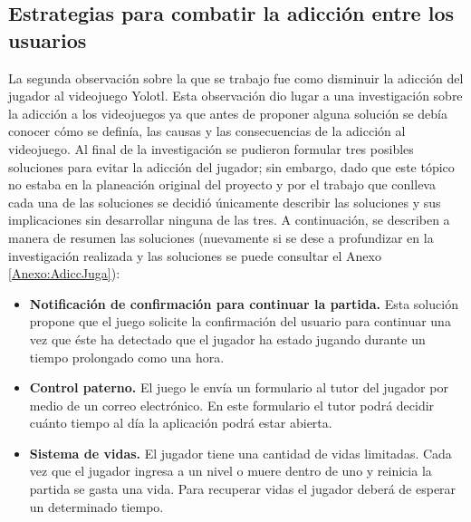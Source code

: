 \subsection{Estrategias para combatir la adicción entre los usuarios}
La segunda observación sobre la que se trabajo fue como disminuir la adicción
del jugador al videojuego Yolotl. Esta observación dio lugar a una investigación
sobre la adicción a los videojuegos ya que antes de proponer alguna solución se
debía conocer cómo se definía, las causas y las consecuencias de la adicción al
videojuego. Al final de la investigación se pudieron formular tres posibles
soluciones para evitar la adicción del jugador; sin embargo, dado que este tópico
no estaba en la planeación original del proyecto y por el trabajo que
conlleva cada una de las soluciones se decidió únicamente describir las
soluciones y sus implicaciones sin desarrollar ninguna de las tres. A continuación,
se describen a manera de resumen las soluciones (nuevamente si se dese a
profundizar en la investigación realizada y las soluciones se puede consultar
el Anexo \ref{Anexo:AdiccJuga}):
    \begin{itemize}
        \item \textbf{Notificación de confirmación para continuar la partida.} Esta
        solución propone que el juego solicite la confirmación del usuario para
        continuar una vez que éste ha detectado que el jugador ha estado jugando
        durante un tiempo prolongado como una hora.
        \item \textbf{Control paterno.} El juego le envía un formulario al tutor del
        jugador por medio de un correo electrónico. En este formulario el tutor podrá
        decidir cuánto tiempo al día la aplicación podrá estar abierta.
        \item \textbf{Sistema de vidas.} El jugador tiene una cantidad de vidas
        limitadas. Cada vez que el jugador ingresa a un nivel o muere dentro de
        uno y reinicia la partida se gasta una vida. Para recuperar vidas el
        jugador deberá de esperar un determinado tiempo.
    \end{itemize}


